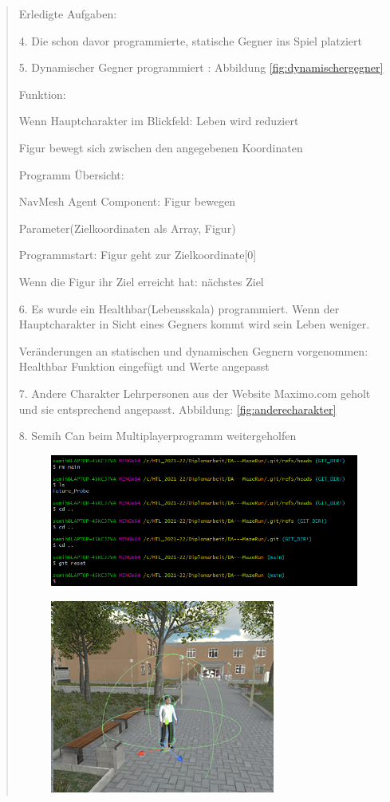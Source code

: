 \begin{quote}
	Erledigte Aufgaben:
	
	4. Die schon davor programmierte, statische Gegner ins Spiel platziert
	
	5. Dynamischer Gegner programmiert : Abbildung \ref{fig:dynamischergegner}
	
	Funktion:
	
		Wenn Hauptcharakter im Blickfeld: Leben wird reduziert
		
		Figur bewegt sich zwischen den angegebenen Koordinaten
		
	Programm Übersicht:
	
	NavMesh Agent Component: Figur bewegen
	
	Parameter(Zielkoordinaten als Array, Figur)
	
	Programmstart: Figur geht zur Zielkoordinate[0]
	
	Wenn die Figur ihr Ziel erreicht hat: nächstes Ziel
	
	6. Es wurde ein Healthbar(Lebensskala) programmiert. Wenn der Hauptcharakter in Sicht eines Gegners kommt wird sein Leben weniger.
	
	Veränderungen an statischen und dynamischen Gegnern vorgenommen: Healthbar Funktion eingefügt und Werte angepasst
	
	7. Andere Charakter Lehrpersonen aus der Website Maximo.com geholt und sie entsprechend angepasst. Abbildung: \ref{fig:anderecharakter}
	
	8. Semih Can beim Multiplayerprogramm weitergeholfen
	
	\begin{figure}
		\centering
		\includegraphics[width=0.7\linewidth]{img/SemihSoenmez_IMG/screenshot02}
		\caption{}
		\label{fig:screenshot02}
	\end{figure}
	\begin{figure}
		\centering
		\includegraphics[width=0.3\linewidth]{img/SemihSoenmez_IMG/Triggerzone}
		\caption{}
		\label{fig:triggerzone}
	\end{figure}


\end{quote}
